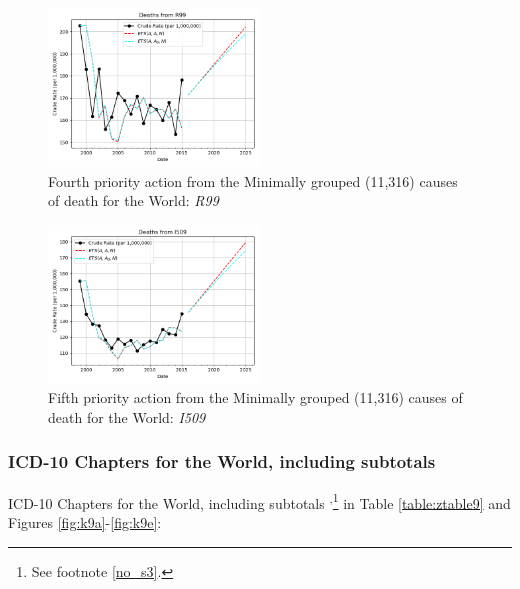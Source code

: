 \documentclass[10pt, a4paper, twocolumn]{IEEEconf}
\begin{document}
\begin{figure}[H]
  \centering
  \includegraphics[width=0.5\textwidth]{results/WORLD_ICD10_MINIMALLY_GROUPED/R99_ets.png}
  \caption{Fourth priority action from the Minimally grouped (11,316) causes of death for the World: \textit{R99}}\label{fig:k8d}
\end{figure}

\begin{figure}[H]
  \centering
  \includegraphics[width=0.5\textwidth]{results/WORLD_ICD10_MINIMALLY_GROUPED/I509_ets.png}
  \caption{Fifth priority action from the Minimally grouped (11,316) causes of death for the World: \textit{I509}}\label{fig:k8e}
\end{figure}

\clearpage

\subsubsection{ICD-10 Chapters for the World, including subtotals}

ICD-10 Chapters for the World, including subtotals \citep{whomortality}\textsuperscript{,}\footnote{See footnote \ref{no_s3}.} in Table \ref{table:ztable9} and Figures \ref{fig:k9a}-\ref{fig:k9e}:
\end{document}
